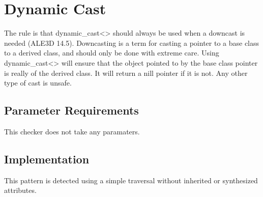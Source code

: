 %
%

\section{Dynamic Cast}
\label{DynamicCast::overview}

   The rule is that dynamic\_cast<> should always be used when a downcast is needed (ALE3D 14.5).
   Downcasting is a term for casting a pointer to a base class to a derived class, and should
   only be done with extreme care. Using dynamic\_cast<> will ensure that the object pointed to
   by the base class pointer is really of the derived class. It will return a nill pointer if
   it is not. Any other type of cast is unsafe.

\subsection{Parameter Requirements}
   This checker does not take any paramaters.

\subsection{Implementation}
    This pattern is detected using a simple traversal without inherited 
or synthesized attributes.

